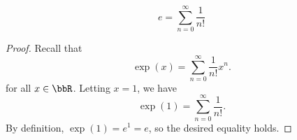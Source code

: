 \begin{corollary} \label{corollary:eulers_number_equals_series_of_reciprocals_of_integer_factorials}
    $$e = \sum_{n=0}^\infty \frac{1}{n!}$$
\end{corollary}
\begin{proof}
    Recall that 
    $$\exp(x) = \sum_{n=0}^\infty \frac{1}{n!} x^n.$$
    for all $x \in \bbR$. Letting $x = 1$, we have 
    $$\exp(1) = \sum_{n=0}^\infty \frac{1}{n!}.$$
    By definition, $\exp(1) = e^1 = e$, so the desired equality holds.
\end{proof}